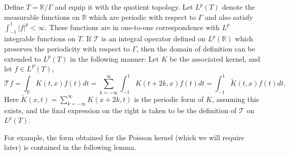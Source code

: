 \documentclass[a4paper, oneside, 12pt]{amsart}
\newcommand{\mc}{\mathcal}
\newcommand{\R}{\mathbb{R}}
\begin{document}
Define $T=\R / \Gamma$ and equip it with the quotient topology. Let $L^p(T)$ denote the measurable functions on $\R$ which are periodic 
with respect to $\Gamma$ and also satisfy $\int_{-1}^1 |f|^p <\infty$. These functions are in one-to-one correspondence with $L^p$ integrable
functions on $T$. If $\mc{T}$ is an integral operator defined on $L^p(\R)$ which preserves the periodicity with respect to $\Gamma$, then 
the domain of definition can be extended to $L^p(T)$ in the following manner: Let $K$ be the associated kernel, and let $f\in L^P(T)$,
$$
    \mc{T}f = \int_\R K(t,x)f(t)dt = \sum_{k=-\infty}^\infty \int _{-1}^1 K(t+2k, x) f(t) dt = \int_{-1}^1 \tilde K(t,x) f(t)dt.
$$
Here $\tilde K(x,t) = \sum_{k=-\infty}^\infty K(x+2k, t)$ is the periodic form of $K$, assuming this exists, and the final expression on the right is taken to be the definition of $\mc{T}$ on $L^p(T)$.

For example, the form obtained for the Poisson kernel (which we will require later) is contained in the following lemma.
\end{document}
